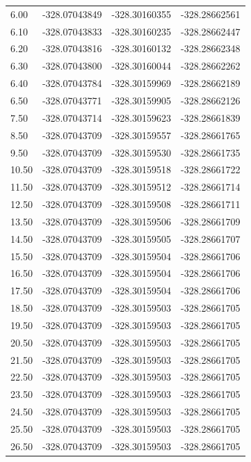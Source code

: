 {{\begin{longtable}{p{} p{} p{} p{}}
    6.00  & -328.07043849 & -328.30160355 & -328.28662561 \\
    6.10  & -328.07043833 & -328.30160235 & -328.28662447 \\
    6.20  & -328.07043816 & -328.30160132 & -328.28662348 \\
    6.30  & -328.07043800 & -328.30160044 & -328.28662262 \\
    6.40  & -328.07043784 & -328.30159969 & -328.28662189 \\
    6.50  & -328.07043771 & -328.30159905 & -328.28662126 \\
    7.50  & -328.07043714 & -328.30159623 & -328.28661839 \\
    8.50  & -328.07043709 & -328.30159557 & -328.28661765 \\
    9.50  & -328.07043709 & -328.30159530 & -328.28661735 \\
    10.50 & -328.07043709 & -328.30159518 & -328.28661722 \\
    11.50 & -328.07043709 & -328.30159512 & -328.28661714 \\
    12.50 & -328.07043709 & -328.30159508 & -328.28661711 \\
    13.50 & -328.07043709 & -328.30159506 & -328.28661709 \\
    14.50 & -328.07043709 & -328.30159505 & -328.28661707 \\
    15.50 & -328.07043709 & -328.30159504 & -328.28661706 \\
    16.50 & -328.07043709 & -328.30159504 & -328.28661706 \\
    17.50 & -328.07043709 & -328.30159504 & -328.28661706 \\
    18.50 & -328.07043709 & -328.30159503 & -328.28661705 \\
    19.50 & -328.07043709 & -328.30159503 & -328.28661705 \\
    20.50 & -328.07043709 & -328.30159503 & -328.28661705 \\
    21.50 & -328.07043709 & -328.30159503 & -328.28661705 \\
    22.50 & -328.07043709 & -328.30159503 & -328.28661705 \\
    23.50 & -328.07043709 & -328.30159503 & -328.28661705 \\
    24.50 & -328.07043709 & -328.30159503 & -328.28661705 \\
    25.50 & -328.07043709 & -328.30159503 & -328.28661705 \\
    26.50 & -328.07043709 & -328.30159503 & -328.28661705 \\

\end{longtable}}}
